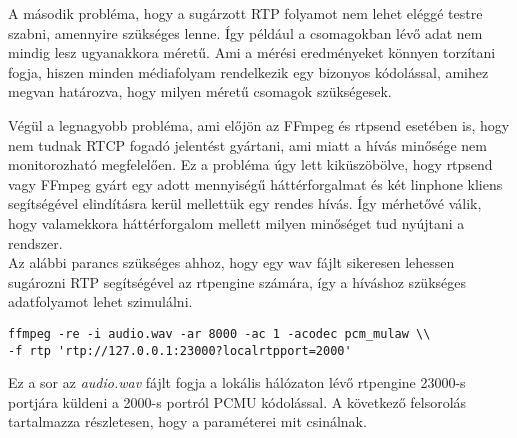 A második probléma, hogy a sugárzott RTP folyamot nem lehet eléggé testre szabni, 
amennyire szükséges lenne. Így például a csomagokban lévő adat nem mindig lesz 
ugyanakkora méretű. Ami a mérési eredményeket könnyen torzítani fogja, hiszen 
minden médiafolyam rendelkezik egy bizonyos kódolással, amihez megvan határozva, hogy
milyen méretű csomagok szükségesek.

Végül a legnagyobb probléma, ami előjön az FFmpeg és rtpsend esetében is, hogy nem
tudnak RTCP fogadó jelentést gyártani, ami miatt a hívás minősége nem monitorozható 
megfelelően. Ez a probléma úgy lett kiküszöbölve, hogy rtpsend vagy FFmpeg gyárt
egy adott mennyiségű háttérforgalmat és két linphone kliens segítségével elindításra 
kerül mellettük egy rendes hívás. Így mérhetővé válik, hogy valamekkora háttérforgalom
mellett milyen minőséget tud nyújtani a rendszer. \\

Az alábbi parancs szükséges ahhoz, hogy egy wav fájlt sikeresen lehessen sugározni
RTP segítségével az rtpengine számára, így a híváshoz szükséges adatfolyamot lehet
szimulálni. 

\begin{lstlisting}
ffmpeg -re -i audio.wav -ar 8000 -ac 1 -acodec pcm_mulaw \\
-f rtp 'rtp://127.0.0.1:23000?localrtpport=2000'
\end{lstlisting}

Ez a sor az \textit{audio.wav} fájlt fogja a lokális hálózaton lévő rtpengine 23000-s
portjára küldeni a 2000-s portról PCMU kódolással. A következő felsorolás 
tartalmazza részletesen, hogy a paraméterei mit csinálnak.

